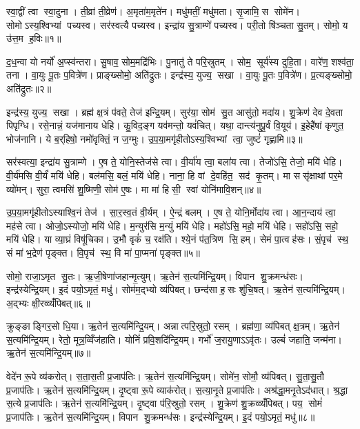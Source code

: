 \clearpage
{}
\setcounter{anuvakam}{0}
स्वा॒द्वीं त्वा स्वा॒दुना। ती॒व्रां ती॒व्रेण॑। अ॒मृता॑म॒मृते॑न। मधु॑मतीं॒ मधु॑मता। सृ॒जामि॒ स सोमे॑न। सोमोऽस्य॒श्विभ्यां पच्यस्व। सर॑स्वत्यै पच्यस्व। इन्द्रा॑य सु॒त्राम्णे॑ पच्यस्व। परी॒तो षि॑ञ्चता सु॒तम्। सोमो॒ य उ॑त्त॒म ह॒विः॥१॥

द॒ध॒न्वा यो नर्यो॑ अ॒प्स्व॑न्तरा। सु॒षाव॒ सोम॒मद्रि॑भिः। पु॒नातु॑ ते परि॒स्रुतम्। सोम॒ सूर्य॑स्य दुहि॒ता। वारे॑ण॒ शश्व॑ता॒ तना। वा॒युः पू॒तः प॒वित्रे॑ण। प्राङ्ख्सोमो॒ अति॑द्रुतः। इन्द्र॑स्य॒ युज्य॒ सखा। वा॒युः पू॒तः प॒वित्रे॑ण। प्र॒त्यङ्ख्सोमो॒ अति॑द्रुतः॥२॥

इन्द्र॑स्य॒ युज्य॒ सखा। ब्रह्म॑ क्ष॒त्रं प॑वते॒ तेज॑ इन्द्रि॒यम्। सुर॑या॒ सोम॑ सु॒त आसु॑तो॒ मदा॑य। शु॒क्रेण॑ देव दे॒वता पिपृग्धि। रसे॒नान्नं॒ यज॑मानाय धेहि। कु॒विद॒ङ्ग यव॑मन्तो॒ यवं॑चित्। यथा॒ दान्त्य॑नुपू॒र्वं वि॒यूय॑। इ॒हेहै॑षां कृणुत॒ भोज॑नानि। ये ब॒र्‌हिषो॒ नमो॑वृक्तिं॒ न ज॒ग्मुः। उ॒प॒या॒मगृ॑हीतोऽस्य॒श्विभ्यां त्वा॒ जुष्टं॑ गृह्णामि॥३॥

सर॑स्वत्या॒ इन्द्रा॑य सु॒त्राम्णे। ए॒ष ते॒ योनि॒स्तेज॑से त्वा। वी॒र्या॑य त्वा॒ बला॑य त्वा। तेजो॑ऽसि॒ तेजो॒ मयि॑ धेहि। वी॒र्य॑मसि वी॒र्यं॑ मयि॑ धेहि। बल॑मसि॒ बलं॒ मयि॑ धेहि। नाना॒ हि वां दे॒वहि॑त॒ सद॑ कृ॒तम्। मा ससृ॑क्षाथां पर॒मे व्यो॑मन्। सुरा॒ त्वमसि॑ शु॒ष्मिणी॒ सोम॑ ए॒षः। मा मा॑ हिसी॒ स्वां योनि॑मावि॒शन्॥४॥

उ॒प॒या॒मगृ॑हीतोऽस्याश्वि॒नं तेज॑। सा॒र॒स्व॒तं वी॒र्यम्। ऐ॒न्द्रं बलम्। ए॒ष ते॒ योनि॒र्मोदा॑य त्वा। आ॒न॒न्दाय॑ त्वा॒ मह॑से त्वा। ओजो॒ऽस्योजो॒ मयि॑ धेहि। म॒न्युर॑सि म॒न्युं मयि॑ धेहि। महो॑ऽसि॒ महो॒ मयि॑ धेहि। सहो॑ऽसि॒ सहो॒ मयि॑ धेहि। या व्या॒घ्रं विषू॑चिका। उ॒भौ वृकं॑ च॒ रक्ष॑ति। श्ये॒नं प॑त॒त्रिण सि॒हम्। सेमं पा॒त्वह॑सः। सं॒पृच॑ स्थ॒ सं मा॑ भ॒द्रेण॑ पृङ्क्त। वि॒पृच॑ स्थ॒ वि मा॑ पा॒प्मना॑ पृङ्क्त॥५॥\anuvakamend[ह॒विः प्र॒त्यङ्ख्सोमो॒ अति॑द्रुतो गृह्णाम्यावि॒शन्विषू॑चिका॒ पञ्च॑ च]

सोमो॒ राजा॒ऽमृत सु॒तः। ऋ॒जी॒षेणा॑जहान्मृ॒त्युम्। ऋ॒तेन॑ स॒त्यमि॑न्द्रि॒यम्। विपान शु॒क्रमन्ध॑सः। इन्द्र॑स्येन्द्रि॒यम्। इ॒दं पयो॒ऽमृतं॒ मधु॑। सोम॑म॒द्भ्यो व्य॑पिबत्। छन्द॑सा ह॒सः शु॑चि॒षत्। ऋ॒तेन॑ स॒त्यमि॑न्द्रि॒यम्। अ॒द्भ्यः क्षी॒रव्व्यँ॑पिबत्॥६॥

क्रुङ्ङाङ्गिर॒सो धि॒या। ऋ॒तेन॑ स॒त्यमि॑न्द्रि॒यम्। अन्नात्परि॒स्रुतो॒ रसम्। ब्रह्म॑णा॒ व्य॑पिबत् क्ष॒त्रम्। ऋ॒तेन॑ स॒त्यमि॑न्द्रि॒यम्। रेतो॒ मूत्र॒व्विँज॑हाति। योनिं॑ प्रवि॒शदि॑न्द्रि॒यम्। गर्भो॑ ज॒रायु॒णाऽऽवृ॑तः। उल्बं॑ जहाति॒ जन्म॑ना। ऋ॒तेन॑ स॒त्यमि॑न्द्रि॒यम्॥७॥

वेदे॑न रू॒पे व्य॑करोत्। स॒ता॒स॒ती प्र॒जाप॑तिः। ऋ॒तेन॑ स॒त्यमि॑न्द्रि॒यम्। सोमे॑न॒ सोमौ॒ व्य॑पिबत्। सु॒ता॒सु॒तौ प्र॒जाप॑तिः। ऋ॒तेन॑ स॒त्यमि॑न्द्रि॒यम्। दृ॒ष्ट्वा रू॒पे व्याक॑रोत्। स॒त्या॒नृ॒ते प्र॒जाप॑तिः। अश्र॑द्धा॒मनृ॒तेऽद॑धात्। श्र॒द्धा स॒त्ये प्र॒जाप॑तिः। ऋ॒तेन॑ स॒त्यमि॑न्द्रि॒यम्। दृ॒ष्ट्वा प॑रि॒स्रुतो॒ रसम्। शु॒क्रेण॑ शु॒क्रव्व्यँ॑पिबत्। पय॒ सोमं॑ प्र॒जाप॑तिः। ऋ॒तेन॑ स॒त्यमि॑न्द्रि॒यम्। विपान शु॒क्रमन्ध॑सः। इन्द्र॑स्येन्द्रि॒यम्। इ॒दं पयो॒ऽमृतं॒ मधु॑॥८॥\anuvakamend[अ॒द्भ्यः क्षी॒रव्व्यँ॑पिब॒ज्जन्म॑न॒र्तेन॑ स॒त्यमि॑न्द्रि॒य श्र॒द्धा स॒त्ये प्र॒जाप॑तिर॒ष्टौ च॑]

